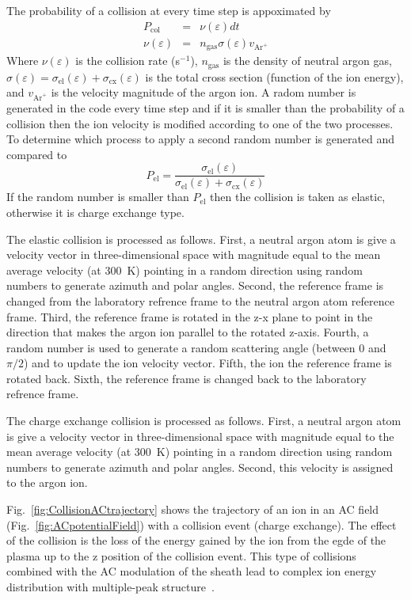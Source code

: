 The probability of a collision at every time step is appoximated by
\begin{eqnarray}
P_{\text{col}} &=& \nu(\varepsilon) dt  \\
\nu(\varepsilon) &=& n_{\text{gas}} \sigma(\varepsilon) v_{\text{Ar}^+}
\end{eqnarray}
Where $\nu(\varepsilon)$ is the collision rate (s$^{-1}$), $n_{\text{gas}}$ is the density of neutral argon gas, $\sigma(\varepsilon) = \sigma_{\text{el}}(\varepsilon) + \sigma_{\text{cx}}(\varepsilon)$ is the total cross section (function of the ion energy), and $v_{\text{Ar}^+}$ is the velocity magnitude of the argon ion. A radom number is generated in the code every time step and if it is smaller than the probability of a collision then the ion velocity is modified according to one of the two processes. To determine which process to apply a second random number is generated and compared to 
\begin{equation}
P_{\text{el}} = \frac{\sigma_{\text{el}}(\varepsilon)}{\sigma_{\text{el}}(\varepsilon) + \sigma_{\text{cx}}(\varepsilon)}
\end{equation}
If the random number is smaller than $P_{\text{el}}$ then the collision is taken as elastic, otherwise it is charge exchange type. 

The elastic collision is processed as follows. First, a neutral argon atom is give a velocity vector in three-dimensional space  with magnitude equal to the mean average velocity (at 300~K) pointing in a random direction using random numbers to generate azimuth and polar angles. Second, the reference frame is changed from the laboratory refrence frame to the neutral argon atom reference frame. Third, the reference frame is rotated in the z-x plane to point in the direction that makes the argon ion parallel to the rotated z-axis. Fourth, a random number is used to generate a random scattering angle (between 0 and $\pi/2$) and to update the ion velocity vector. Fifth, the ion the reference frame is rotated back. Sixth, the reference frame is changed back to the laboratory refrence frame.

The charge exchange collision is processed as follows. First, a neutral argon atom is give a velocity vector in three-dimensional space  with magnitude equal to the mean average velocity (at 300~K) pointing in a random direction using random numbers to generate azimuth and polar angles. Second, this velocity is assigned to the argon ion.    

Fig.~\ref{fig:CollisionACtrajectory} shows the trajectory of an ion in an AC field (Fig.~\ref{fig:ACpotentialField}) with a collision event (charge exchange). The effect of the collision is the loss of the energy gained by the ion from the egde of the plasma up to the z position of the collision event. This type of collisions combined with the AC modulation of the sheath lead to complex ion energy distribution with multiple-peak structure~\cite{Wild1991}.

